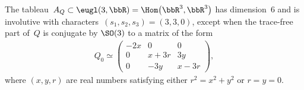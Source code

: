 \begin{Proposition}\label{prop: nondegenerateA_Q}
The tableau~$A_Q\subset \eugl(3,\bbR) = \Hom \big(\bbR^3,\bbR^3\big)$
has dimension~$6$ and is involutive
with characters~$(s_1,s_2,s_3) = (3,3,0)$,
except when the trace-free part of~$Q$ is conjugate by $\SO(3)$
to a matrix of the form
\begin{gather}\label{eq: Q0normalizeddegenerate}
Q_0 \simeq \begin{pmatrix}-2x&0&0\\0&x+3r&3y\\0&-3y&x-3r\end{pmatrix},
\end{gather}
where $(x,y,r)$ are real numbers satisfying either $r^2 = x^2 + y^2$
or $r = y = 0$.
\end{Proposition}

